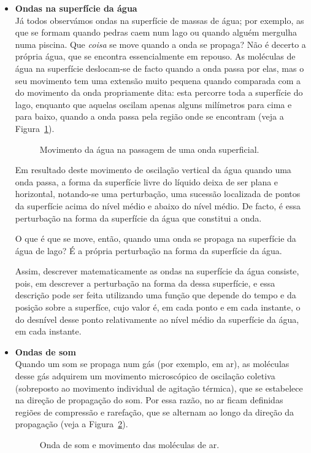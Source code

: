 \begin{itemize}
\item \textbf{Ondas na superfície da água}\\
    Já todos observámos ondas na superfície de massas de água; por exemplo, as
    que se formam quando pedras caem num lago ou quando alguém mergulha numa
    piscina. Que \emph{coisa} se move quando a onda se propaga? Não é decerto a
    própria água, que se encontra essencialmente em repouso. As moléculas de
    água na superfície deslocam-se de facto quando a onda passa por elas, mas o
    seu movimento tem uma extensão muito pequena quando comparada com a do
    movimento da onda propriamente dita: esta percorre toda a superfície do
    lago, enquanto que aquelas oscilam apenas alguns milímetros para cima e para
    baixo, quando a onda passa pela região onde se encontram (veja a
    Figura~\ref{fig:oo010}).
    \begin{figure}[htb]
        {\centering
            
            \caption{Movimento da água na passagem de uma onda
                superficial.\label{fig:oo010}}

        }
    \end{figure}
    Em resultado deste movimento de oscilação vertical da água quando uma onda
    passa, a forma da superfície livre do líquido deixa de ser plana e
    horizontal, notando-se uma perturbação, uma sucessão localizada de pontos da
    superfície acima do nível médio e abaixo do nível médio. De facto, é essa
    perturbação na forma da superfície da água que constitui a onda.

    O que é que se move, então, quando uma onda se propaga na superfície da água
    de lago? É a própria perturbação na forma da superfície da água. 

    Assim, descrever matematicamente as ondas na superfície da água consiste,
    pois, em descrever a perturbação na forma da dessa superfície, e essa
    descrição pode ser feita utilizando uma função que depende do tempo e da
    posição sobre a superfíce, cujo valor é, em cada ponto e em cada instante, o
    do desnível desse ponto relativamente ao nível médio da superfície da água,
    em cada instante.

\item \textbf{Ondas de som}\\
    Quando um som se propaga num gás (por exemplo, em ar), as moléculas desse
    gás adquirem um movimento microscópico de oscilação coletiva (sobreposto ao
    movimento individual de agitação térmica), que se estabelece na direção de
    propagação do som. Por essa razão, no ar ficam definidas regiões de
    compressão e rarefação, que se alternam ao longo da direção da propagação
    (veja a Figura~\ref{fig:oof020}).
    \begin{figure}[htb]
        {\centering
            \caption{Onda de som e movimento das moléculas de ar.%
                \label{fig:oof020}}

}
\end{figure}
\end{itemize}
